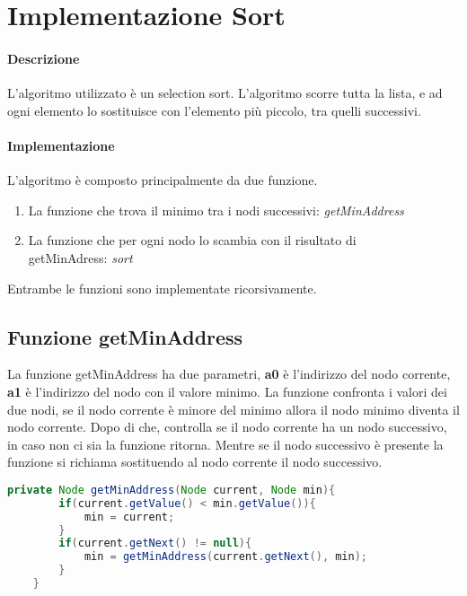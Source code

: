 \section{Implementazione Sort}

\paragraph{Descrizione}
L'algoritmo utilizzato è un selection sort. 
L'algoritmo scorre tutta la lista, e ad ogni elemento lo sostituisce
 con l'elemento più piccolo, tra quelli successivi.

\paragraph{Implementazione}
L'algoritmo è composto principalmente da due funzione. 
\begin{enumerate}
    \item \label{func:getMinAddress}La funzione che trova il minimo tra i nodi successivi: \textit{getMinAddress}
    \item \label{func:sort}La funzione che per ogni nodo lo scambia con il risultato di \\getMinAdress: \textit{sort}
\end{enumerate}
Entrambe le funzioni sono implementate ricorsivamente.
\subsection{Funzione getMinAddress}
La funzione getMinAddress ha due parametri, 
\textbf{a0} è l'indirizzo del nodo corrente, \textbf{a1} è l'indirizzo del nodo con il valore minimo.
La funzione confronta i valori dei due nodi, se il nodo corrente è minore del minimo allora il nodo minimo diventa il nodo corrente.
Dopo di che, controlla se il nodo corrente ha un nodo successivo, in caso non ci sia la funzione ritorna. Mentre se il nodo successivo è presente
la funzione si richiama sostituendo al nodo corrente il nodo successivo.
\\

\begin{lstlisting}[language=java,caption={Codice java algoritmo getMinAddress},captionpos=b] 
    private Node getMinAddress(Node current, Node min){
        if(current.getValue() < min.getValue()){
            min = current;
        }
        if(current.getNext() != null){
            min = getMinAddress(current.getNext(), min);
        }
    }


\end{lstlisting}

